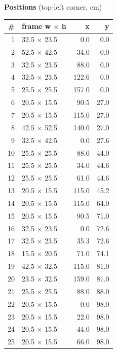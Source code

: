 \documentclass[a4paper,landscape,10pt]{article}
\begin{document}
\begin{minipage}[t]{0.25\textwidth}
\vspace{8pt}
{\bfseries Positions} (top-left corner, cm)\\[2pt]
\tiny
\begin{tabular}{@{}r l r r@{}}
\toprule
\# & frame w $\times$ h & x & y \\
\midrule
1 & 32.5 $\times$ 23.5 & 0.0 & 0.0 \\
2 & 52.5 $\times$ 42.5 & 34.0 & 0.0 \\
3 & 32.5 $\times$ 23.5 & 88.0 & 0.0 \\
4 & 32.5 $\times$ 23.5 & 122.6 & 0.0 \\
5 & 25.5 $\times$ 25.5 & 157.0 & 0.0 \\
6 & 20.5 $\times$ 15.5 & 90.5 & 27.0 \\
7 & 20.5 $\times$ 15.5 & 115.0 & 27.0 \\
8 & 42.5 $\times$ 52.5 & 140.0 & 27.0 \\
9 & 32.5 $\times$ 42.5 & 0.0 & 27.6 \\
10 & 25.5 $\times$ 25.5 & 88.0 & 44.0 \\
11 & 25.5 $\times$ 25.5 & 34.0 & 44.6 \\
12 & 25.5 $\times$ 25.5 & 61.0 & 44.6 \\
13 & 20.5 $\times$ 15.5 & 115.0 & 45.2 \\
14 & 20.5 $\times$ 15.5 & 115.0 & 64.0 \\
15 & 20.5 $\times$ 15.5 & 90.5 & 71.0 \\
16 & 32.5 $\times$ 23.5 & 0.0 & 72.6 \\
17 & 32.5 $\times$ 23.5 & 35.3 & 72.6 \\
18 & 15.5 $\times$ 20.5 & 71.0 & 74.1 \\
19 & 42.5 $\times$ 32.5 & 115.0 & 81.0 \\
20 & 23.5 $\times$ 32.5 & 159.0 & 81.0 \\
21 & 25.5 $\times$ 25.5 & 88.0 & 88.0 \\
22 & 20.5 $\times$ 15.5 & 0.0 & 98.0 \\
23 & 20.5 $\times$ 15.5 & 22.0 & 98.0 \\
24 & 20.5 $\times$ 15.5 & 44.0 & 98.0 \\
25 & 20.5 $\times$ 15.5 & 66.0 & 98.0 \\
\bottomrule
\end{tabular}
\end{minipage}
\clearpage
\end{document}
